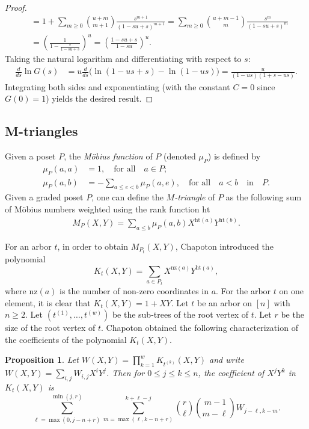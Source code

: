 \documentclass[reqno, 12pt]{article}
\newtheorem{prop}[thm]{Proposition}
\theoremstyle{mydefinition}
\theoremstyle{myremark}
\begin{document}
\begin{proof}
\begin{align*}
&= 1 + \sum_{m\geq0} \binom{u+m}{m+1} \frac{s^{m+1}}{(1-su+s)^{m+1}}=\sum_{m\geq0} \binom{u+m-1}{m}\frac{s^m}{(1-su+s)^m}\\
&=\left(\frac{1}{1-\frac{s}{1-su+s}} \right)^u=\left( \frac{1-su+s}{1-su} \right)^u.
\end{align*}
Taking the natural logarithm and differentiating with respect to $s$:
\begin{align*}
\frac{d}{ds} \ln G(s) &= u \frac{d}{ds} \Big( \ln(1-us+s) - \ln(1-us) \Big)= \frac{u}{(1-us)(1+s-us)}.
\end{align*}
Integrating both sides and exponentiating (with the constant $C=0$ since $G(0)=1$) yields the desired result.
\end{proof}

\subsection{M-triangles}


Given a poset $P$, the \emph{M\"obius function} of $P$ (denoted $\mu_P$) is defined by 
\begin{align*}
\mu_P(a,a)&=1,\quad \text{for all} \quad a\in P;
\\ \mu_P(a,b)&=-\sum_{a\leq e<b} \mu_P(a,e), \quad \text{for all} \quad a<b \quad\text{in}\quad P.
\end{align*}
Given a graded poset $P$, one can define the \emph{$M$-triangle} of $P$ as the following sum of M\"obius numbers weighted using the rank function $\mathrm{ht}$ 
\begin{align*}
M_P(X, Y) = \sum_{a \leq b} \mu_P(a, b) X^{\mathrm{ht}(a)} Y^{\mathrm{ht}(b)}.
\end{align*}


For an arbor $t$, in order to obtain $M_{P_t}(X,Y)$, Chapoton introduced the polynomial
$$K_t(X,Y)=\sum_{a\in P_t}X^{\mathrm{nz}(a)}Y^{\mathrm{ht}(a)},$$ 
where $\mathrm{nz}(a)$ is the number of non-zero coordinates in $a$.
For the arbor $t$ on one element, it is clear that $K_t(X,Y)= 1 + XY$. 
Let $t$ be an arbor on $[n]$ with $n \geq 2$. Let $(t^{(1)},\ldots,t^{(w)})$ be the sub-trees of the root vertex of $t$. Let $r$ be the size of the root vertex of $t$. Chapoton obtained the following characterization of the coefficients of the polynomial $K_t(X,Y)$.

\begin{prop}{\em \cite[Proposition 2.8]{Chapoton}}\label{Chap2.8}
Let $W(X,Y)= \prod_{k=1}^w K_{t^{(k)}}(X,Y)$ and write $W(X,Y)= \sum_{i,j} W_{i,j} X^i Y^j$. Then for $0 \leq j \leq k \leq n$, the coefficient of $X^j Y^k$ in $K_t(X,Y)$ is
\[\sum_{\ell = \max(0,j-n+r)}^{\min(j,r)} \sum_{m = \max(\ell,k-n+r)}^{k+\ell-j} \binom{r}{\ell} \binom{m-1}{m-\ell} W_{j-\ell,k-m}. 
\]
\end{prop}
\end{document}
